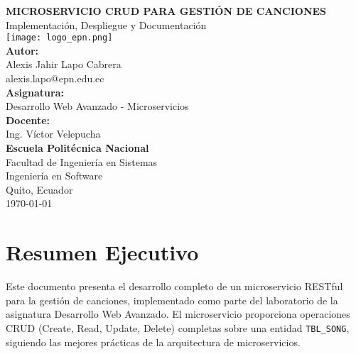 \documentclass[12pt,a4paper]{article}
\begin{document}
\begin{titlepage}
    \centering
    \vspace*{2cm}
    
    {\huge\bfseries MICROSERVICIO CRUD PARA GESTIÓN DE CANCIONES}\\[1cm]
    {\Large Implementación, Despliegue y Documentación}\\[2cm]
    
    \texttt{[image: logo\_epn.png]}\\[2cm]
    
    {\large\bfseries Autor:}\\
    {\large Alexis Jahir Lapo Cabrera}\\
    {\normalsize alexis.lapo@epn.edu.ec}\\[1cm]
    
    {\large\bfseries Asignatura:}\\
    {\large Desarrollo Web Avanzado - Microservicios}\\[0.5cm]
    
    {\large\bfseries Docente:}\\
    {\large Ing. Víctor Velepucha}\\[1cm]
    
    {\large\bfseries Escuela Politécnica Nacional}\\
    {\large Facultad de Ingeniería en Sistemas}\\
    {\large Ingeniería en Software}\\[1cm]
    
    {\large Quito, Ecuador}\\
    {\large \today}
    
    \vfill
\end{titlepage}

\newpage
\tableofcontents
\newpage
\listoffigures
\newpage
\listoftables
\newpage

\section{Resumen Ejecutivo}

Este documento presenta el desarrollo completo de un microservicio RESTful para la gestión de canciones, implementado como parte del laboratorio de la asignatura Desarrollo Web Avanzado. El microservicio proporciona operaciones CRUD (Create, Read, Update, Delete) completas sobre una entidad \texttt{TBL\_SONG}, siguiendo las mejores prácticas de la arquitectura de microservicios.
\end{document}
